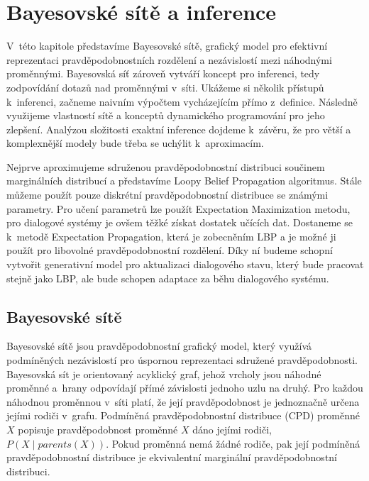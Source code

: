 \chapter{Bayesovské sítě a inference}
\label{ch:kap2}

V~této kapitole představíme Bayesovské sítě, grafický model pro efektivní reprezentaci pravděpodobnostních rozdělení a nezávislostí mezi náhodnými proměnnými.
Bayesovská síť zároveň vytváří koncept pro inferenci, tedy zodpovídání dotazů nad proměnnými v~síti.
Ukážeme si několik přístupů k~inferenci, začneme naivním výpočtem vycházejícím přímo z~definice.
Následně využijeme vlastností sítě a konceptů dynamického programování pro jeho zlepšení.
Analýzou složitosti exaktní inference dojdeme k~závěru, že pro větší a komplexnější modely bude třeba se uchýlit k~aproximacím.

Nejprve aproximujeme sdruženou pravděpodobnostní distribuci součinem marginálních distribucí a představíme Loopy Belief Propagation algoritmus.
Stále můžeme použít pouze diskrétní pravděpodobnostní distribuce se známými parametry.
Pro učení parametrů lze použít Expectation Maximization metodu, pro dialogové systémy je ovšem těžké získat dostatek učících dat.
Dostaneme se k~metodě Expectation Propagation, která je zobecněním LBP a je možné ji použít pro libovolné pravděpodobnostní rozdělení.
Díky ní budeme schopní vytvořit generativní model pro aktualizaci dialogového stavu, který bude pracovat stejně jako LBP, ale bude schopen adaptace za běhu dialogového systému.

\section{Bayesovské sítě}
\label{sec:bn}

Bayesovské sítě jsou pravděpodobnostní grafický model, který využívá podmíněných nezávislostí pro úspornou reprezentaci sdružené pravděpodobnosti.
Bayesovská sít je orientovaný acyklický graf, jehož vrcholy jsou náhodné proměnné a~hrany odpovídají přímé závislosti jednoho uzlu na druhý.
Pro každou náhodnou proměnnou v~síti platí, že její pravděpodobnost je jednoznačně určena jejími rodiči v~grafu.
Podmíněná pravděpodobnostní distribuce (CPD) proměnné $X$ popisuje pravděpodobnost proměnné $X$ dáno jejími rodiči, $P(X \mid parents(X))$.
Pokud proměnná nemá žádné rodiče, pak její podmíněná pravděpodobnostní distribuce je ekvivalentní marginální pravděpodobnostní distribuci.

